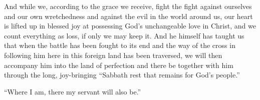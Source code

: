 And while we, according to the grace we receive, fight the fight against ourselves and our own wretchedness and against the evil in the world around us, our heart is lifted up in blessed joy at possessing God’s unchangeable love in Christ, and we count everything as loss, if only we may keep it. And he himself has taught us that when the battle has been fought to its end and the way of the cross in following him here in this foreign land has been traversed, we will then accompany him into the land of perfection and there be together with him through the long, joy-bringing “Sabbath rest that remains for God’s people.”

“Where I am, there my servant will also be.”